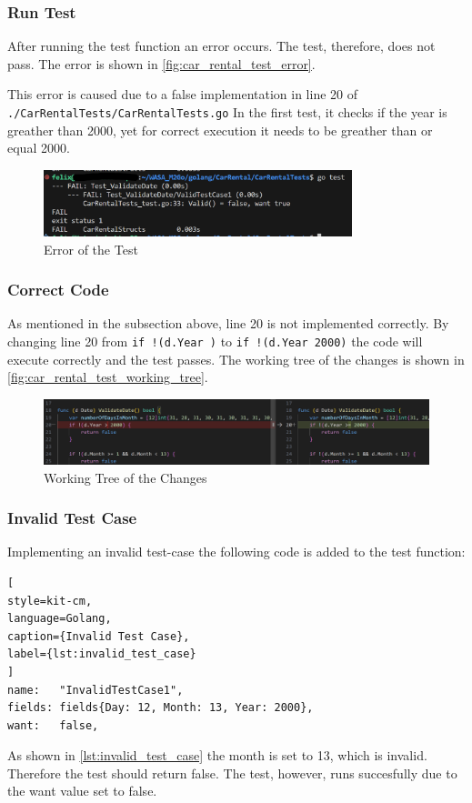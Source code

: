 \subsubsection*{Run Test}
After running the test function an error occurs. 
The test, therefore, does not pass.
The error is shown in \autoref{fig:car_rental_test_error}.

This error is caused due to a false implementation in line 20 of \hfill \linebreak \texttt{./CarRentalTests/CarRentalTests.go}
In the first test, it checks if the year is greather than 2000, yet for correct execution it needs to be greather than or equal 2000.

\begin{figure}[H]
    \centering
    \includegraphics[width=0.8\textwidth]{figures/goLang/carRental/carRental_dateTestError.png}
    \caption{Error of the Test}
    \label{fig:car_rental_test_error}
\end{figure}

\subsubsection*{Correct Code}
As mentioned in the subsection above, line 20 is not implemented correctly.
By changing line 20 from \texttt{if !(d.Year )} to \texttt{if !(d.Year \>\= 2000)} the code will execute correctly and the test passes.
The working tree of the changes is shown in \autoref{fig:car_rental_test_working_tree}.

\begin{figure}[H]
    \centering
    \includegraphics[width=\textwidth]{figures/goLang/carRental/carRental_dateTestWorkingTree.png}
    \caption{Working Tree of the Changes}
    \label{fig:car_rental_test_working_tree}
\end{figure}

\subsubsection*{Invalid Test Case}
Implementing an invalid test-case the following code is added to the test function:
\begin{lstlisting}[
style=kit-cm,
language=Golang,
caption={Invalid Test Case},
label={lst:invalid_test_case}
]
name:   "InvalidTestCase1",
fields: fields{Day: 12, Month: 13, Year: 2000},
want:   false,  
\end{lstlisting}

As shown in \autoref{lst:invalid_test_case} the month is set to 13, which is invalid.
Therefore the test should return false.
The test, however, runs succesfully due to the want value set to false.
